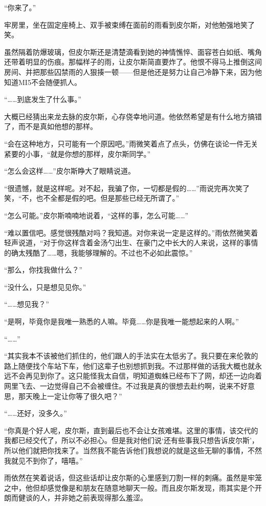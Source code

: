 “你来了。”

牢房里，坐在固定座椅上、双手被束缚在面前的雨看到皮尔斯，对他勉强地笑了笑。

虽然隔着防爆玻璃，但皮尔斯还是清楚滴看到她的神情憔悴、面容苍白如纸、嘴角还带着明显的伤痕。那幅样子的雨，让皮尔斯简直要炸了。他恨不得马上推倒这间房间、并把那些囚禁雨的人狠揍一顿——但是他还是努力让自己冷静下来，因为他知道MI5不会随便抓人。

“……到底发生了什么事。”

大概已经猜出来龙去脉的皮尔斯，心存侥幸地问道。他依然希望是有什么地方搞错了，而不是真如他想的那样。

“会在这种地方，只可能有一个原因吧。”雨微笑着点了点头，仿佛在谈论一件无关紧要的小事，“就是你想的那样，皮尔斯同学。”

“怎么会这样……”皮尔斯睁大了眼睛说道。

“很遗憾，就是这样呢。对不起，我骗了你，一切都是假的……”雨说完再次笑了笑，“不，也不全都是假的吧。但是那些已经无所谓了。”

“怎么可能。”皮尔斯喃喃地说着，“这样的事，怎么可能……”

“难以置信吧。感觉很残酷对吗？我知道。对你来说一定是这样的。”雨依然微笑着轻声说道，“对于你这样含着金汤勺出生、在豪门之中长大的人来说，这样的事情的确太残酷了……嗯，我能够理解的。不过也不必如此震惊。”

“那么，你找我做什么？”

“没什么，只是想见见你。”

“……想见我？”

“是啊，毕竟你是我唯一熟悉的人嘛。毕竟……你是我唯一能想起来的人啊。”

“……”

“其实我本不该被他们抓住的，他们跟人的手法实在太低劣了。我只要在来伦敦的路上随便找个车站下车，他们这辈子也别想抓到我。不过那样做的话我大概也就永远不会再见到你了。这只能怪我太自信，明知道蜘蛛已经布下了网，却还一边向着网里飞去、一边觉得自己不会被缠住。不过我是真的很想去赴约啊，说来不好意思，那天晚上一定让你等了很久吧？”

“……还好，没多久。”

“你真是个好人呢，皮尔斯，直到最后也不会让女孩难堪。这里的事情，该交代的我都已经交代了，所以不必担心。但是我对他们说‘还有些事我只想告诉皮尔斯’，所以他们就把你找来了。当然我不能告诉他们我想说的就是这些无聊的事情，不然我就见不到你了，嘻嘻。”

雨依然在笑着说话，但这些话却让皮尔斯的心里感到刀割一样的刺痛。虽然是牢笼之中，他但却感觉像是和朋友在随意地聊天一般。而且皮尔斯发现，雨其实是个开朗而健谈的人，并非她之前表现得那么羞涩。

